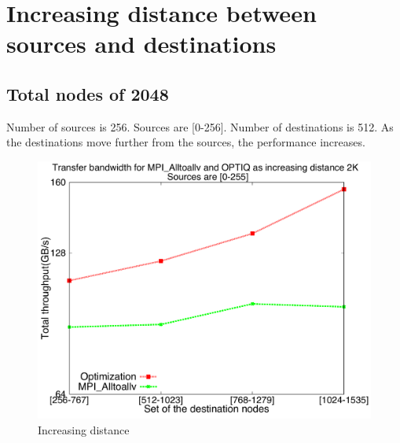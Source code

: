 \documentclass[letter]{article}
\begin{document}
\clearpage
\newpage

\section {Increasing distance between sources and destinations}

\subsection{Total nodes of 2048}

Number of sources is 256. Sources are [0-256]. Number of destinations is 512. As the destinations move further from the sources, the performance increases.

\begin{figure}[h]
\vspace{-0.1in}
\centering
\includegraphics[scale=0.40]{report_figures/incrdist/incrdist_2k.pdf}
\vspace{-0.1in}
\caption{Increasing distance}
\vspace{-0.1in}
\label{fig:incrdist_2k}
\end{figure}

\clearpage
\newpage
\end{document}
